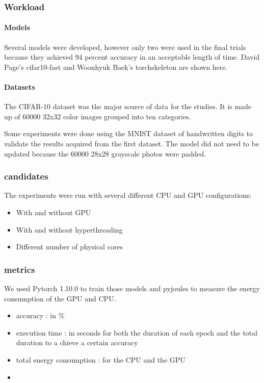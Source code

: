 \subsubsection{Workload}
\paragraph{Models}

Several models were developed, however only two were used in the final trials because they achieved 94 percent accuracy in an acceptable length of time.
David Page's cifar10-fast and Woonhyuk Baek's torchskeleton are shown here.
\paragraph{Datasets}

The CIFAR-10 dataset was the major source of data for the studies.
It is made up of 60000 32x32 color images grouped into ten categories.

Some experiments were done using the MNIST dataset of handwritten digits to validate the results acquired from the first dataset.
The model did not need to be updated because the 60000 28x28 grayscale photos were padded.


\subsubsection{candidates}
The experiments were run with several different CPU and GPU configurations:

\begin{itemize}
    \item With and without GPU
    \item With and without hyperthreading
    \item Different number of physical cores
\end{itemize}

\subsubsection{metrics}


We used Pytorch 1.10.0  to train those models and pyjoules to measure the energy consumption of the GPU and CPU.
\begin{itemize}
    \item accuracy : in \%
    \item execution time : in seconds for both the duration of each epoch and the total duration to a chieve a certain accuracy
    \item total energy consumption : for the CPU and the  GPU
    \item
\end{itemize}


